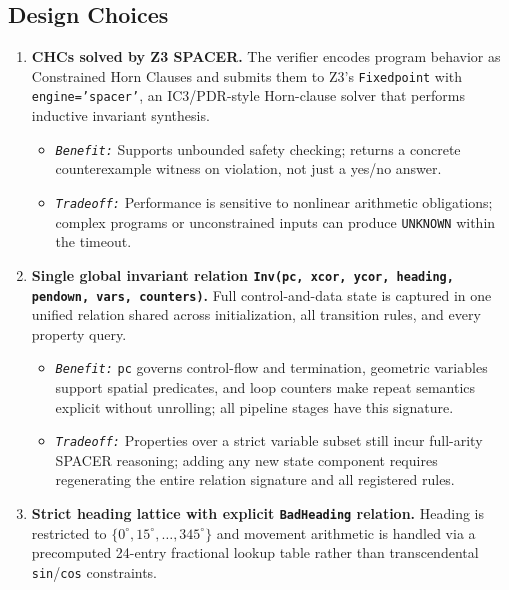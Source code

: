 \subsection*{Design Choices}

\begin{enumerate}[leftmargin=1.5em, itemsep=6pt, topsep=4pt]
    \item \textbf{CHCs solved by Z3 SPACER.}
    The verifier encodes program behavior as Constrained Horn Clauses and submits them to Z3's \texttt{Fixedpoint} with \texttt{engine='spacer'}, an IC3/PDR-style Horn-clause solver that performs inductive invariant synthesis.
    \begin{itemize}[leftmargin=1.5em, noitemsep, topsep=2pt]
        \item \noindent\textit{\small \texttt{Benefit:}} Supports unbounded safety checking; returns a concrete counterexample witness on violation, not just a yes/no answer.
        \item \noindent\textit{\small \texttt{Tradeoff:}} Performance is sensitive to nonlinear arithmetic obligations; complex programs or unconstrained inputs can produce \texttt{UNKNOWN} within the timeout.
    \end{itemize}
    \item \textbf{Single global invariant relation \texttt{Inv(pc, xcor, ycor, heading, pendown, vars, counters)}.}
    Full control-and-data state is captured in one unified relation shared across initialization, all transition rules, and every property query.
    \begin{itemize}[leftmargin=1.5em, noitemsep, topsep=2pt]
        \item \noindent\textit{\small \texttt{Benefit:}} \texttt{pc} governs control-flow and termination, geometric variables support spatial predicates, and loop counters make repeat semantics explicit without unrolling; all pipeline stages have this signature.
        \item \noindent\textit{\small \texttt{Tradeoff:}} Properties over a strict variable subset still incur full-arity SPACER reasoning; adding any new state component requires regenerating the entire relation signature and all registered rules.
    \end{itemize}
    \item \textbf{Strict heading lattice with explicit \texttt{BadHeading} relation.}
    Heading is restricted to $\{0^\circ, 15^\circ, \ldots, 345^\circ\}$ and movement arithmetic is handled via a precomputed 24-entry fractional lookup table rather than transcendental \texttt{sin}/\texttt{cos} constraints.

\end{enumerate}
